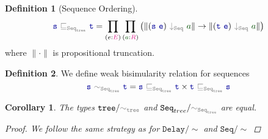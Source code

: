 \documentclass[twoside,11pt,openright]{report}
\theoremstyle{plain} %
\newtheorem*{cor}{Corollary}
\theoremstyle{definition}
\newtheorem{defn}{Definition}[section]
\theoremstyle{remark}
\newcommand*{\term}[1]{\textcolor{green!30!black}{#1}} %
\newcommand*{\type}[1]{\textcolor{magenta!90!black}{#1}}
\newcommand*{\relation}[1]{\textcolor{gray}{\ensuremath{\mathtt{#1}}}}
\newcommand*{\function}[1]{\textcolor{blue!60!black}{\ensuremath{\mathtt{#1}}}}
\newcommand*{\typeformer}[1]{\ensuremath{\mathtt{#1}}}
\begin{document}
\begin{defn}[Sequence Ordering]
  \begin{equation}
    \function{s}~\relation{\sqsubseteq_{\typeformer{Seq}_{tree}}}~\function{t} = \prod_{(e : \type{E})} \prod_{(\term{a} : \type{R})} \left(\|(\function{s}~\function{e})~\relation{\downarrow_{\mathtt{Seq}}}~\term{a}\| \rightarrow \| (\function{t}~\function{e})~\relation{\downarrow_{\mathtt{Seq}}}~\term{a}\|\right) 
  \end{equation}
  where \(\| \cdot \|\) is propositional truncation.
\end{defn}
\begin{defn}
  We define weak bisimularity relation for sequences 
  \begin{equation}
    \function{s}~\relation{\sim_{\typeformer{Seq}_{tree}}}~\function{t} = \function{s}~\relation{\sqsubseteq_{\typeformer{Seq}_{tree}}}~\function{t} \times \function{t}~\relation{\sqsubseteq_{\typeformer{Seq}_{tree}}}~\function{s}
  \end{equation}
\end{defn}
\begin{cor}
  The types \(\typeformer{tree}/\relation{\sim_{tree}}\) and \(\typeformer{Seq}_{tree} / \relation{\sim_{\typeformer{Seq}_{tree}}}\) are equal.
  \begin{proof}
    We follow the same strategy as for \(\typeformer{Delay}/{\sim}\) and \(\typeformer{Seq}/{\sim}\)
  \end{proof}
\end{cor}
\end{document}
